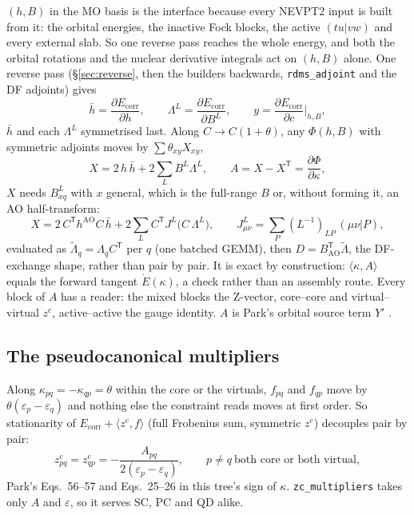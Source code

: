 \documentclass[11pt]{article}
\newcommand{\code}[1]{\texttt{#1}}
\newcommand{\eps}{\varepsilon}
\newcommand{\Ecorr}{E_{\mathrm{corr}}}
\newcommand{\hb}{\bar h}
\newcommand{\Lb}{\Lambda}
\newcommand{\T}{\mathsf T}
\begin{document}
$(h, B)$ in the MO basis is the interface because every NEVPT2 input is
built from it: the orbital energies, the inactive Fock blocks, the active
$(tu|vw)$ and every external slab. So one reverse pass reaches the whole
energy, and both the orbital rotations and the nuclear derivative
integrals act on $(h, B)$ alone. One reverse pass (\S\ref{sec:reverse}, then the builders backwards,
\code{rdms\_adjoint} and the DF adjoints) gives
\begin{equation}
  \hb = \frac{\partial\Ecorr}{\partial h},\qquad
  \Lb^L = \frac{\partial\Ecorr}{\partial B^L},\qquad
  y = \frac{\partial\Ecorr}{\partial c}\Big|_{h,B},
\end{equation}
$\hb$ and each $\Lb^L$ symmetrised last. Along $C \to C(1+\theta)$, any
$\Phi(h, B)$ with symmetric adjoints moves by $\sum\theta_{xy}X_{xy}$,
\begin{equation}
  X = 2\,h\,\hb + 2\sum_L B^L\Lb^L,\qquad
  A = X - X^\T = \frac{\partial\Phi}{\partial\kappa},
  \label{eq:X}
\end{equation}
$X$ needs $B^L_{xq}$ with $x$ general, which is the full-range $B$ or,
without forming it, an AO half-transform:
\begin{equation}
  X = 2\,C^\T h^{\mathrm{AO}}C\,\hb
    + 2\sum_L C^\T J^L\bigl(C\,\Lb^L\bigr),\qquad
  J^L_{\mu\nu} = \sum_P (L^{-1})_{LP}\,(\mu\nu|P),
  \label{eq:Xao}
\end{equation}
evaluated as $\tilde\Lb_q = \Lb_q C^\T$ per $q$ (one batched GEMM), then
$D = B_{\mathrm{AO}}^\T\tilde\Lb$, the DF-exchange shape, rather than pair by
pair. It is exact by construction: $\langle\kappa, A\rangle$ equals the
forward tangent $\dot E(\kappa)$, a check rather than an assembly route. Every block of $A$ has a reader: the mixed blocks
the Z-vector, core--core and virtual--virtual $z^c$, active--active the
gauge identity. $A$ is Park's orbital source term $Y'$ \cite{park2019}.

\subsection{The pseudocanonical multipliers}
\label{sec:zc}

Along $\kappa_{pq} = -\kappa_{qp} = \theta$ within the core or the virtuals,
$f_{pq}$ and $f_{qp}$ move by $\theta(\eps_p - \eps_q)$ and nothing else the
constraint reads moves at first order. So stationarity of $\Ecorr +
\langle z^c, f\rangle$ (full Frobenius sum, symmetric $z^c$) decouples pair
by pair:
\begin{equation}
  z^c_{pq} = z^c_{qp} = -\frac{A_{pq}}{2(\eps_p - \eps_q)},\qquad
  p\ne q\ \text{both core or both virtual},
  \label{eq:zc}
\end{equation}
Park's Eqs.~56--57 \cite{park2019} and Eqs.~25--26 \cite{park2020} in this
tree's sign of $\kappa$. \code{zc\_multipliers} takes only $A$ and $\eps$, so
it serves SC, PC and QD alike.
\end{document}
